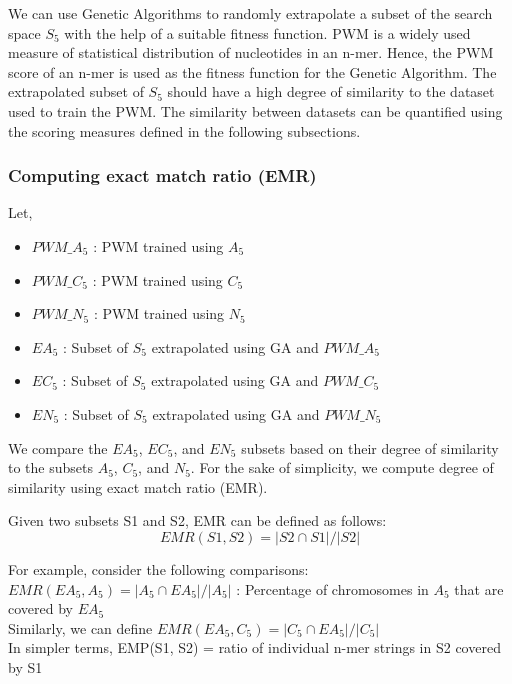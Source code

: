 \documentclass[12pt,a4paper]{article}
\begin{document}
	We can use Genetic Algorithms to randomly extrapolate a subset of the search space $S_5$ with the help of a suitable fitness function. PWM is a widely used measure of statistical distribution of nucleotides in an n-mer. Hence, the PWM score of an n-mer is used as the fitness function for the Genetic Algorithm. The extrapolated subset of $S_5$ should have a high degree of similarity to the dataset used to train the PWM. The similarity between datasets can be quantified using the scoring measures defined in the following subsections.\par
	
	\subsubsection{Computing exact match ratio (EMR)}
	Let,
	\begin{itemize}
		\item $PWM\_A_5$ : PWM trained using $A_5$
		\item $PWM\_C_5$ : PWM trained using $C_5$
		\item $PWM\_N_5$ : PWM trained using $N_5$
		\item $EA_5$ : Subset of $S_5$ extrapolated using GA and $PWM\_A_5$
		\item $EC_5$ : Subset of $S_5$ extrapolated using GA and $PWM\_C_5$
		\item $EN_5$ : Subset of $S_5$ extrapolated using GA and $PWM\_N_5$
	\end{itemize}
	
	We compare the $EA_5$, $EC_5$, and $EN_5$ subsets based on their degree of similarity to the subsets $A_5$, $C_5$, and $N_5$. For the sake of simplicity, we compute degree of similarity using exact match ratio (EMR). \par
	Given two subsets S1 and S2, EMR can be defined as follows:
	\begin{equation}
		EMR(S1, S2) = |S2 \cap S1| / |S2|
		\label{eq-emr}
	\end{equation}
	
	For example, consider the following comparisons:\\
	$ EMR(EA_5, A_5) = |A_5 \cap EA_5| / |A_5| $ : Percentage of chromosomes in $A_5$ that are covered by $EA_5$ \\
	Similarly, we can define $ EMR(EA_5, C_5) = |C_5 \cap EA_5| / |C_5| $ \\
	In simpler terms, EMP(S1, S2) = ratio of individual n-mer strings in S2 covered by S1
\end{document}
